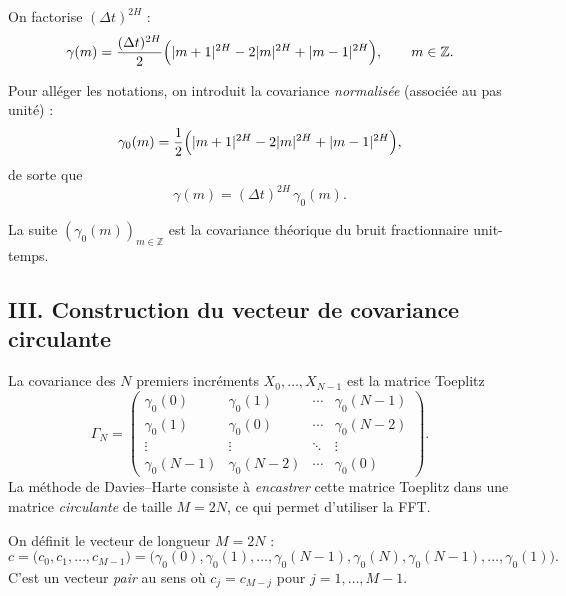 \documentclass[11pt,a4paper]{article}
\newcommand{\1}{\mathbf{1}}
\begin{document}
On factorise $(\Delta t)^{2H}$ :
\begin{equation}
  \gamma(m)
  = \frac{(\Delta t)^{2H}}{2}
    \Bigl(|m+1|^{2H} - 2|m|^{2H} + |m-1|^{2H}\Bigr),
  \qquad m\in\mathbb{Z}.
\end{equation}

Pour alléger les notations, on introduit la covariance \emph{normalisée}
(associée au pas unité) :
\begin{equation}
  \gamma_0(m)
  = \frac{1}{2}\Bigl(|m+1|^{2H} - 2|m|^{2H} + |m-1|^{2H}\Bigr),
\end{equation}
de sorte que
\begin{equation}
  \gamma(m) = (\Delta t)^{2H}\,\gamma_0(m).
\end{equation}

La suite $(\gamma_0(m))_{m\in\mathbb{Z}}$ est la covariance
théorique du bruit fractionnaire unit-temps.

\subsection*{III. Construction du vecteur de covariance circulante}

La covariance des $N$ premiers incréments $X_0,\dots,X_{N-1}$
est la matrice Toeplitz
\begin{equation}
  \Gamma_N =
  \begin{pmatrix}
    \gamma_0(0)   & \gamma_0(1)   & \cdots & \gamma_0(N-1) \\
    \gamma_0(1)   & \gamma_0(0)   & \cdots & \gamma_0(N-2) \\
    \vdots        & \vdots        & \ddots & \vdots        \\
    \gamma_0(N-1) & \gamma_0(N-2) & \cdots & \gamma_0(0)
  \end{pmatrix}.
\end{equation}
La méthode de Davies--Harte consiste à \emph{encastrer} cette
matrice Toeplitz dans une matrice \emph{circulante} de taille
$M=2N$, ce qui permet d'utiliser la FFT.

On définit le vecteur de longueur $M=2N$ :
\begin{equation}
  c =
  \bigl(
  c_0,c_1,\dots,c_{M-1}
  \bigr)
  =
  \bigl(
    \gamma_0(0),\gamma_0(1),\dots,
    \gamma_0(N-1),\gamma_0(N),\gamma_0(N-1),\dots,\gamma_0(1)
  \bigr).
\end{equation}
C'est un vecteur \emph{pair} au sens où $c_j=c_{M-j}$ pour
$j=1,\dots,M-1$.
\end{document}
